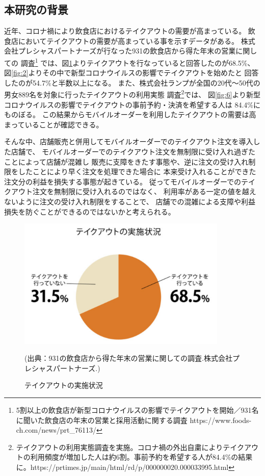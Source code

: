 \documentclass{jsarticle}
\begin{document}
\subsection{本研究の背景}
近年、コロナ禍により飲食店におけるテイクアウトの需要が高まっている。
飲食店においてテイクアウトの需要が高まっている事を示すデータがある。
株式会社プレシャスパートナーズが行なった931の飲食店から得た年末の営業に関しての
調査\footnote{5割以上の飲食店が新型コロナウイルスの影響でテイクアウトを開始／931名に聞いた飲食店の年末の営業と採用活動に関する調査 https://www.foods-ch.com/news/prt\_76113/}
では、図\ref{fig:1}よりテイクアウトを行なっていると回答したのが68.5\%、
図\ref{fig:2}よりその中で新型コロナウイルスの影響でテイクアウトを始めたと
回答したのが54.7\%と半数以上になる。
また、株式会社ランプが全国の20代〜50代の男女889名を対象に行ったテイクアウトの利用実態
調査\footnote{テイクアウトの利用実態調査を実施。コロナ禍の外出自粛によりテイクアウトの利用頻度が増加した人は約6割。事前予約を希望する人が84.4\%の結果に。https://prtimes.jp/main/html/rd/p/000000020.000033995.html}では、
図\ref{fig:6}より新型コロナウイルスの影響でテイクアウトの事前予約・決済を希望する人は
84.4\%にものぼる。
この結果からモバイルオーダーを利用したテイクアウトの需要は高まっていることが確認できる。

そんな中、店舗販売と併用してモバイルオーダーでのテイクアウト注文を導入した店舗で、
モバイルオーダーでのテイクアウト注文を無制限に受け入れ過ぎたことによって店舗が混雑し
販売に支障をきたす事態\cite{bibi1}や、逆に注文の受け入れ制限をしたことにより早く注文を処理できた場合に
本来受け入れることができた注文分の利益を損失する事態が起きている。
従ってモバイルオーダーでのテイクアウト注文を無制限に受け入れるのではなく、
利用率がある一定の値を越えないように注文の受け入れ制限をすることで、
店舗での混雑による支障や利益損失を防ぐことができるのではないかと考えられる。

\begin{figure}[H]
  \centering
  \includegraphics[width=10cm]{1.png}
  \caption{テイクアウトの実施状況}
  \scriptsize(出典：931の飲食店から得た年末の営業に関しての調査.株式会社プレシャスパートナーズ.)
  \label{fig:1}
\end{figure}
\end{document}
